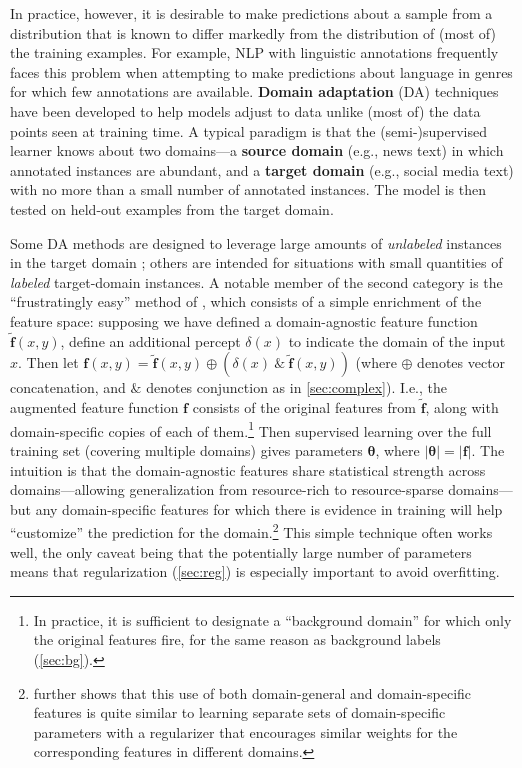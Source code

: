 \documentclass[11pt,letterpaper]{article}
\begin{document}
In practice, however, it is desirable to make predictions about a sample 
from a distribution that is known to differ markedly from the distribution 
of (most of) the training examples. For example, NLP with linguistic annotations 
frequently faces this problem when attempting to make predictions about 
language in genres for which few annotations are available. 
\textbf{Domain adaptation} (DA) techniques have been developed to help models adjust  
to data unlike (most of) the data points seen at training time.
A typical paradigm is that the \mbox{(semi-)}supervised learner knows about two domains---a 
\textbf{source domain} (e.g., news text) in which annotated instances are abundant, and 
a \textbf{target domain} (e.g., social media text) with no more than a small number of annotated instances. 
The model is then tested on held-out examples from the target domain. 

Some DA methods are designed to leverage large amounts of \emph{unlabeled} instances 
in the target domain \citep{sogaard-13}; others are intended for situations with small quantities of \emph{labeled} 
target-domain instances. A notable member of the second category 
is the ``frustratingly easy'' method of \citet{daume-07}, 
which consists of a simple enrichment of the feature space:
supposing we have defined a domain-agnostic feature function $\tilde{\mathbf{f}}(x,y)$, 
define an additional percept $\delta(x)$ to indicate the domain of the input $x$.
Then let $\mathbf{f}(x,y) = \tilde{\mathbf{f}}(x,y) \oplus (\delta(x)\ \&\ \tilde{\mathbf{f}}(x,y))$ 
(where $\oplus$ denotes vector concatenation, and $\&$ denotes conjunction as in \cref{sec:complex}).
I.e., the augmented feature function $\mathbf{f}$ 
consists of the original features from $\tilde{\mathbf{f}}$, along with domain-specific copies 
of each of them.\footnote{In practice, it is sufficient to designate a ``background domain'' 
for which only the original features fire, for the same reason as background labels (\cref{sec:bg}).} 
Then supervised learning over the full training set (covering multiple domains) 
gives parameters $\boldsymbol{\theta}$, where $|\boldsymbol{\theta}| = |\mathbf{f}|$.
The intuition is that the domain-agnostic features share statistical strength 
across domains---allowing generalization from resource-rich to resource-sparse domains---but
any domain-specific features for which there is evidence in training 
will help ``customize'' the prediction for the domain.\footnote{\label{fn:da-reg}%
further shows that this use of both domain-general and domain-specific features 
is quite similar to learning separate sets of domain-specific parameters 
with a regularizer that encourages similar weights for the corresponding features in different domains.}
This simple technique often works well, the only caveat being that the potentially large number of parameters 
means that regularization (\cref{sec:reg}) is especially important to avoid overfitting.
\end{document}
